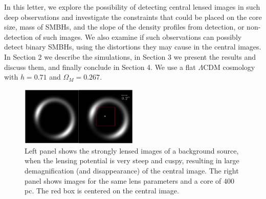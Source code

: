 \documentclass[chicago]{emulateapj}
\begin{document}
 In this letter, we explore the possibility of detecting central lensed images in such deep observations and investigate the constraints that could be placed on the core size, mass of SMBHs, and the slope of the density profiles from detection, or non-detection of such images. We also examine if 
 such observations can possibly detect binary SMBHs, using the distortions they may cause in the central images. 
 In Section 2 we describe the simulations, in Section 3 we present the results and discuss them, and finally conclude in Section 4. We use a flat $\Lambda$CDM cosmology with $h=0.71$ and $\Omega_M=0.267$.
 


\begin{figure}
\begin{center}
\centering
\includegraphics[trim= 10 0 0 0, clip, width=0.5\textwidth]{figures/f_02.eps}
\centering
\end{center}
\caption{ Left panel shows the strongly lensed images of a background source, when the lensing potential is very steep and cuspy, resulting in large demagnification (and disappearance) of the central image.  The right panel shows images for the same lens parameters and a core of 400 pc. The red box is centered on the  central image.
\label{fig1}}
\end{figure}
\end{document}
